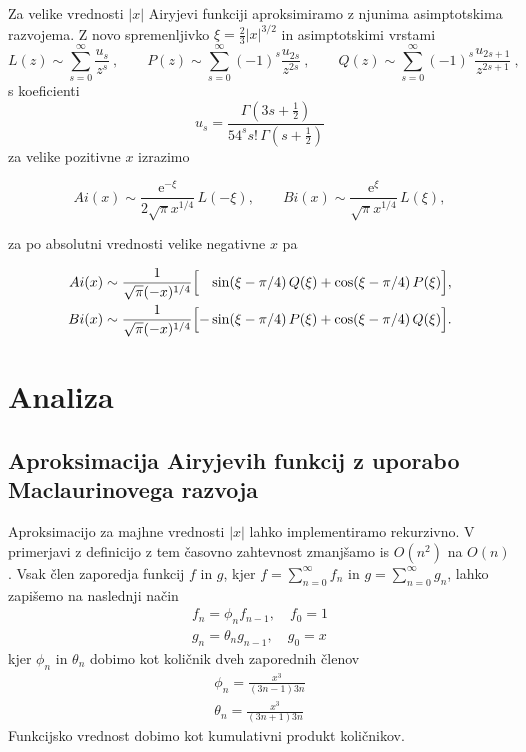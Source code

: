 \documentclass[12pt, a4paper]{article}
\begin{document}
Za velike vrednosti $|x|$ Airyjevi funkciji aproksimiramo
z njunima asimp\-tot\-ski\-ma razvojema.  Z novo spremenljivko
$\xi=\frac{2}{3} |x|^{3/2}$ in asimptotskimi vrstami
%
\begin{equation*}
  L(z) \sim \sum_{s=0}^\infty \frac{u_s}{z^s}\>,\qquad
  P(z) \sim \sum_{s=0}^\infty (-1)^s \frac{u_{2s}}{z^{2 s}}\>,\qquad
  Q(z) \sim \sum_{s=0}^\infty (-1)^s \frac{u_{2s+1}}{z^{2 s+1}}\>,
\end{equation*}
s koeficienti
\begin{equation*}
u_s = \frac{ \Gamma(3s + \frac{1}{2})}
        {54^s s!\, \Gamma(s + \frac{1}{2}) }
\end{equation*}
za velike pozitivne $x$ izrazimo

\begin{equation*}
Ai(x)\sim  \frac{\mathrm{e}^{-\xi}}{2\sqrt{\pi} x^{1/4}} \, L(-\xi), \qquad
Bi(x)\sim  \frac{\mathrm{e}^{\xi}} { \sqrt{\pi} x^{1/4}} \, L(\xi),
\end{equation*}

za po absolutni vrednosti velike negativne $x$ pa

\begin{align*}
    Ai(x)&\sim  \frac{1}{\sqrt{\pi} (-x)^{1/4}} \Bigl[ \phantom{-}\sin(\xi-\pi/4) \, Q(\xi) + \cos(\xi-\pi/4) \, P(\xi)\Bigr], \\
    Bi(x)&\sim  \frac{1}{\sqrt{\pi} (-x)^{1/4}} \Bigl[ - \sin(\xi-\pi/4) \, P(\xi) + \cos(\xi-\pi/4) \, Q(\xi)\Bigr].
\end{align*}



    
\section{Analiza}

\subsection{Aproksimacija Airyjevih funkcij z uporabo Maclaurinovega razvoja}

Aproksimacijo za majhne vrednosti $|x|$ lahko implementiramo rekurzivno. V primerjavi
z definicijo z tem časovno zahtevnost zmanjšamo is $O(n^2)$ na $O(n)$. Vsak člen
zaporedja funkcij $f$ in $g$, kjer $f = \sum_{n=0}^{\infty} f_n$ in $g = \sum_{n=0}^{\infty} g_n$, lahko zapišemo na naslednji način
\begin{align*}
  f_n = \phi_n f_{n-1}, \quad f_0 = 1 \\
  g_n = \theta_n g_{n-1}, \quad g_0 = x
\end{align*}
kjer $\phi_n$ in $\theta_n$ dobimo kot količnik dveh zaporednih členov
\begin{align*}
  \phi_n = \frac{x^3}{(3n-1)3n} \\
  \theta_n = \frac{x^3}{(3n+1)3n}
\end{align*}
Funkcijsko vrednost dobimo kot kumulativni produkt količnikov. \\
\end{document}
